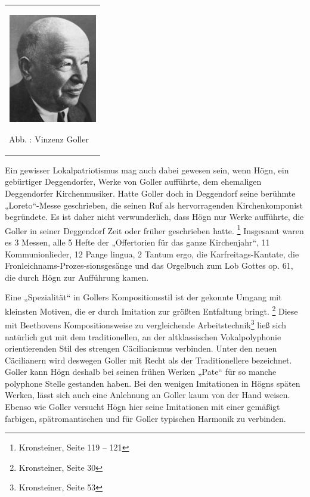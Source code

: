 \begin{center}
\begin{minipage}{4.249cm}
\begin{flushleft}
\tablefirsthead{}
\tablehead{}
\tabletail{}
\tablelasttail{}
\begin{supertabular}{m{4.0490003cm}}

\includegraphics[width=3.866cm,height=4.773cm]{pictures/zulassungsarbeit-img089.jpg}

Abb. : Vinzenz Goller\\
\end{supertabular}
\end{flushleft}
\end{minipage}
\end{center}
Ein gewisser Lokalpatriotismus mag auch dabei gewesen sein, wenn Högn,
ein gebürtiger Deggendorfer, Werke von Goller aufführte, dem ehemaligen
Deggendorfer Kirchenmusiker. Hatte Goller doch in Deggendorf seine
berühmte „Loreto“-Messe geschrieben, die seinen Ruf als hervorragenden
Kirchenkomponist begründete. Es ist daher nicht verwunderlich, dass
Högn nur Werke aufführte, die Goller in seiner Deggendorf Zeit oder
früher geschrieben hatte. \footnote{Kronsteiner, Seite 119 – 121}
Insgesamt waren es 3 Messen, alle 5 Hefte der „Offertorien für das
ganze Kirchenjahr“, 11 Kommunionlieder, 12 Pange
lingua,\textcolor[rgb]{0.6,0.6,0.6}{ }2 Tantum ergo, die
Karfreitags-Kantate, die Fronleichnams-Prozes-sionsgesänge und das
Orgelbuch zum Lob Gottes op. 61, die durch Högn zur Aufführung kamen.

Eine „Spezialität“ in Gollers Kompositionsstil ist der gekonnte Umgang
mit kleinsten Motiven, die er durch Imitation zur größten Entfaltung
bringt. \footnote{Kronsteiner, Seite 30} Diese mit Beethovens
Kompositionsweise zu vergleichende Arbeitstechnik\footnote{
Kronsteiner, Seite 53} ließ sich natürlich gut mit dem traditionellen,
an der altklassischen Vokalpolyphonie orientierenden Stil des strengen
Cäcilianismus verbinden. Unter den neuen Cäcilianern wird deswegen
Goller mit Recht als der Traditionellere bezeichnet. Goller kann Högn
deshalb bei seinen frühen Werken „Pate“ für so manche polyphone Stelle
gestanden haben. Bei den wenigen Imitationen in Högns späten Werken,
lässt sich auch eine Anlehnung an Goller kaum von der Hand weisen.
Ebenso wie Goller versucht Högn hier seine Imitationen mit einer
gemäßigt farbigen, spätromantischen und für Goller typischen Harmonik
zu verbinden.

